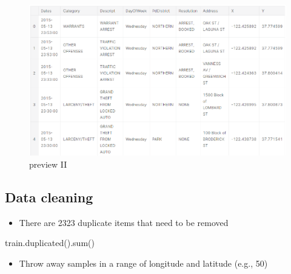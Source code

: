 \documentclass{amsart}
\begin{document}
	\begin{center}
	\begin{figure}[htbp]
		\includegraphics[scale=0.5]{./pic/qmyangben.eps}
		\caption{preview II}
	\end{figure}
\end{center}

\newpage

\subsection{Data cleaning}
	\begin{itemize}
		\item There are 2323 duplicate items that need to be removed
	\end{itemize}
	train.duplicated().sum()
	\begin{itemize}
		\item Throw away samples in a range of longitude and latitude (e.g., 50)
	\end{itemize}
\end{document}
